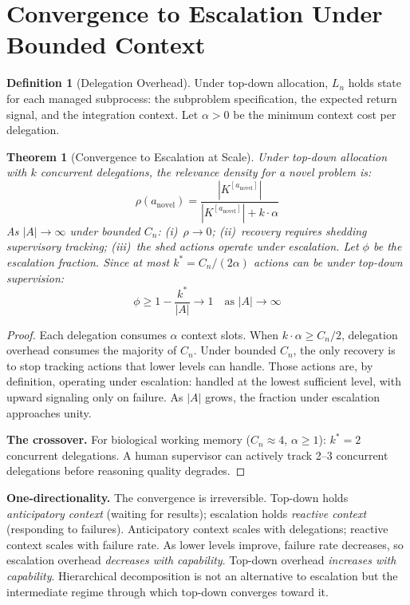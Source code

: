 \documentclass[11pt]{article}
\newtheorem{theorem}{Theorem}
\theoremstyle{definition}
\newtheorem{definition}{Definition}
\theoremstyle{remark}
\begin{document}
\section{Convergence to Escalation Under Bounded Context}
\label{sec:escalation}

\begin{definition}[Delegation Overhead]
\label{def:delegation}
Under top-down allocation, $L_n$ holds state for each managed
subprocess: the subproblem specification, the expected return signal,
and the integration context. Let $\alpha > 0$ be the minimum context
cost per delegation.
\end{definition}

\begin{theorem}[Convergence to Escalation at Scale]
\label{thm:topdown}
Under top-down allocation with $k$ concurrent delegations, the
relevance density for a novel problem is:
\[
\rho(a_{\mathrm{novel}}) =
\frac{|K^{[a_{\mathrm{novel}}]}|}{|K^{[a_{\mathrm{novel}}]}| + k \cdot \alpha}
\]
As $|A| \to \infty$ under bounded $C_n$: (i)~$\rho \to 0$;
(ii)~recovery requires shedding supervisory tracking;
(iii)~the shed actions operate under escalation. Let $\phi$ be the
escalation fraction. Since at most $k^* = C_n / (2\alpha)$ actions
can be under top-down supervision:
\[
\phi \geq 1 - \frac{k^*}{|A|} \to 1 \quad \text{as } |A| \to \infty
\]
\end{theorem}

\begin{proof}
Each delegation consumes $\alpha$ context slots. When
$k \cdot \alpha \geq C_n / 2$, delegation overhead consumes the
majority of $C_n$. Under bounded $C_n$, the only recovery is to stop
tracking actions that lower levels can handle. Those actions are,
by definition, operating under escalation: handled at the lowest
sufficient level, with upward signaling only on failure. As $|A|$
grows, the fraction under escalation approaches unity.

\textbf{The crossover.} For biological working memory ($C_n \approx 4$,
$\alpha \geq 1$): $k^* = 2$ concurrent delegations. A human supervisor
can actively track 2--3 concurrent delegations before reasoning
quality degrades.
\end{proof}

\textbf{One-directionality.} The convergence is irreversible. Top-down
holds \emph{anticipatory context} (waiting for results); escalation
holds \emph{reactive context} (responding to failures). Anticipatory
context scales with delegations; reactive context scales with failure
rate. As lower levels improve, failure rate decreases, so escalation
overhead \emph{decreases with capability}. Top-down overhead
\emph{increases with capability}. Hierarchical decomposition is not an
alternative to escalation but the intermediate regime through which
top-down converges toward it.
\end{document}

